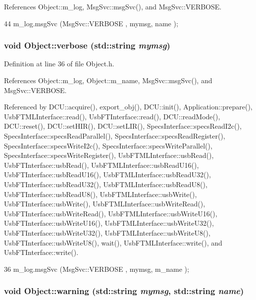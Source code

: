 References Object::m\_\-log, MsgSvc::msgSvc(), and MsgSvc::VERBOSE.


\begin{DoxyCode}
44 { m_log.msgSvc (MsgSvc::VERBOSE , mymsg, name ); }
\end{DoxyCode}
\hypertarget{classObject_a83d2db2df682907ea1115ad721c1c4a1}{
\subsubsection[{verbose}]{\setlength{\rightskip}{0pt plus 5cm}void Object::verbose (std::string {\em mymsg})}}
\label{classObject_a83d2db2df682907ea1115ad721c1c4a1}


Definition at line 36 of file Object.h.

References Object::m\_\-log, Object::m\_\-name, MsgSvc::msgSvc(), and MsgSvc::VERBOSE.

Referenced by DCU::acquire(), export\_\-obj(), DCU::init(), Application::prepare(), UsbFTMLInterface::read(), UsbFTInterface::read(), DCU::readMode(), DCU::reset(), DCU::setHIR(), DCU::setLIR(), SpecsInterface::specsReadI2c(), SpecsInterface::specsReadParallel(), SpecsInterface::specsReadRegister(), SpecsInterface::specsWriteI2c(), SpecsInterface::specsWriteParallel(), SpecsInterface::specsWriteRegister(), UsbFTMLInterface::usbRead(), UsbFTInterface::usbRead(), UsbFTMLInterface::usbReadU16(), UsbFTInterface::usbReadU16(), UsbFTMLInterface::usbReadU32(), UsbFTInterface::usbReadU32(), UsbFTMLInterface::usbReadU8(), UsbFTInterface::usbReadU8(), UsbFTMLInterface::usbWrite(), UsbFTInterface::usbWrite(), UsbFTMLInterface::usbWriteRead(), UsbFTInterface::usbWriteRead(), UsbFTMLInterface::usbWriteU16(), UsbFTInterface::usbWriteU16(), UsbFTMLInterface::usbWriteU32(), UsbFTInterface::usbWriteU32(), UsbFTMLInterface::usbWriteU8(), UsbFTInterface::usbWriteU8(), wait(), UsbFTMLInterface::write(), and UsbFTInterface::write().


\begin{DoxyCode}
36 { m_log.msgSvc (MsgSvc::VERBOSE , mymsg, m_name ); }
\end{DoxyCode}
\hypertarget{classObject_a11f101db4dd73d9391b0231818881d86}{
\subsubsection[{warning}]{\setlength{\rightskip}{0pt plus 5cm}void Object::warning (std::string {\em mymsg}, \/  std::string {\em name})}}
\label{classObject_a11f101db4dd73d9391b0231818881d86}


